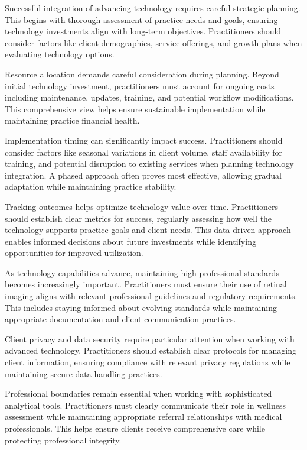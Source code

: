 \documentclass[
  Letterpaper,
]{scrbook}
\begin{document}
Successful integration of advancing technology requires careful
strategic planning. This begins with thorough assessment of practice
needs and goals, ensuring technology investments align with long-term
objectives. Practitioners should consider factors like client
demographics, service offerings, and growth plans when evaluating
technology options.

Resource allocation demands careful consideration during planning.
Beyond initial technology investment, practitioners must account for
ongoing costs including maintenance, updates, training, and potential
workflow modifications. This comprehensive view helps ensure sustainable
implementation while maintaining practice financial health.

Implementation timing can significantly impact success. Practitioners
should consider factors like seasonal variations in client volume, staff
availability for training, and potential disruption to existing services
when planning technology integration. A phased approach often proves
most effective, allowing gradual adaptation while maintaining practice
stability.

Tracking outcomes helps optimize technology value over time.
Practitioners should establish clear metrics for success, regularly
assessing how well the technology supports practice goals and client
needs. This data-driven approach enables informed decisions about future
investments while identifying opportunities for improved utilization.

As technology capabilities advance, maintaining high professional
standards becomes increasingly important. Practitioners must ensure
their use of retinal imaging aligns with relevant professional
guidelines and regulatory requirements. This includes staying informed
about evolving standards while maintaining appropriate documentation and
client communication practices.

Client privacy and data security require particular attention when
working with advanced technology. Practitioners should establish clear
protocols for managing client information, ensuring compliance with
relevant privacy regulations while maintaining secure data handling
practices.

Professional boundaries remain essential when working with sophisticated
analytical tools. Practitioners must clearly communicate their role in
wellness assessment while maintaining appropriate referral relationships
with medical professionals. This helps ensure clients receive
comprehensive care while protecting professional integrity.
\end{document}
